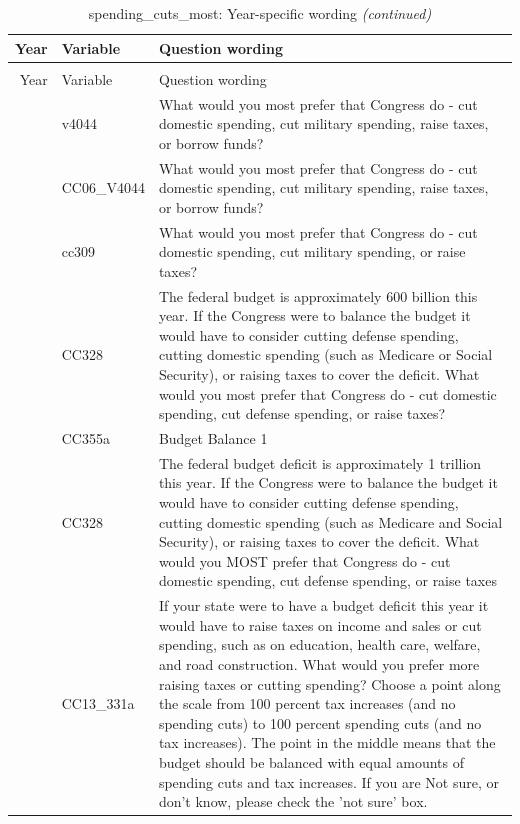 \documentclass[
  12pt]{article}
\begin{document}
\begin{longtable}[t]{rl>{\raggedright\arraybackslash}p{10cm}}
\caption{\label{tab:unnamed-chunk-5}spending\_cuts\_most: Year-specific wording}\\
\toprule
Year & Variable & Question wording\\
\midrule
\endfirsthead
\caption[]{spending\_cuts\_most: Year-specific wording \textit{(continued)}}\\
\toprule
Year & Variable & Question wording\\
\midrule
\endhead

\endfoot
\bottomrule
\endlastfoot
2006 & v4044 & What would you most prefer that Congress do - cut domestic spending, cut military spending, raise taxes, or borrow funds?\\
\addlinespace
2007 & CC06\_V4044 & What would you most prefer that Congress do - cut domestic spending, cut military spending, raise taxes, or borrow funds?\\
\addlinespace
2008 & cc309 & What would you most prefer that Congress do - cut domestic spending, cut military spending, or raise taxes?\\
\addlinespace
2010 & CC328 & The federal budget is approximately 600 billion this year. If the Congress were to balance the budget it would have to consider cutting defense spending, cutting domestic spending (such as Medicare or Social Security), or raising taxes to cover the deficit. What would you most prefer that Congress do - cut domestic spending, cut defense spending, or raise taxes?\\
\addlinespace
2011 & CC355a & Budget Balance 1\\
\addlinespace
2012 & CC328 & The federal budget deficit is approximately 1 trillion this year. If the Congress were to balance the budget it would have to consider cutting defense spending, cutting domestic spending (such as Medicare and Social Security), or raising taxes to cover the deficit. What would you MOST prefer that Congress do - cut domestic spending, cut defense spending, or raise taxes\\
\addlinespace
2013 & CC13\_331a & If your state were to have a budget deficit this year it would have to raise taxes on income and sales or cut spending, such as on education, health care, welfare, and road construction. What would you prefer more raising taxes or cutting spending? Choose a point along the scale from 100 percent tax increases (and no spending cuts) to 100 percent spending cuts (and no tax increases). The point in the middle means that the budget should be balanced with equal amounts of spending cuts and tax increases. If you are Not sure, or don't know, please check the 'not sure' box.\\

\end{longtable}
\end{document}
